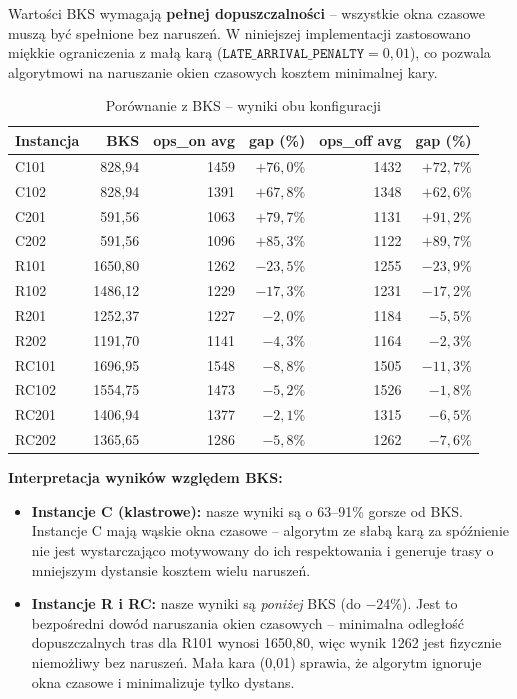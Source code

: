 \documentclass[11pt,a4paper]{article}
\begin{document}
Wartości BKS wymagają \textbf{pełnej dopuszczalności} -- wszystkie okna czasowe muszą być
spełnione bez naruszeń. W niniejszej implementacji zastosowano miękkie ograniczenia
z małą karą ($\texttt{LATE\_ARRIVAL\_PENALTY} = 0{,}01$), co pozwala algorytmowi
na naruszanie okien czasowych kosztem minimalnej kary.

\begin{table}[H]
\centering
\caption{Porównanie z BKS -- wyniki obu konfiguracji}
\begin{tabular}{lrrrrr}
\toprule
Instancja & BKS & ops\_on avg & gap (\%) & ops\_off avg & gap (\%) \\
\midrule
C101  & 828{,}94  & 1459 & $+76{,}0\%$ & 1432 & $+72{,}7\%$ \\
C102  & 828{,}94  & 1391 & $+67{,}8\%$ & 1348 & $+62{,}6\%$ \\
C201  & 591{,}56  & 1063 & $+79{,}7\%$ & 1131 & $+91{,}2\%$ \\
C202  & 591{,}56  & 1096 & $+85{,}3\%$ & 1122 & $+89{,}7\%$ \\
R101  & 1650{,}80 & 1262 & $-23{,}5\%$ & 1255 & $-23{,}9\%$ \\
R102  & 1486{,}12 & 1229 & $-17{,}3\%$ & 1231 & $-17{,}2\%$ \\
R201  & 1252{,}37 & 1227 & $-2{,}0\%$  & 1184 & $-5{,}5\%$  \\
R202  & 1191{,}70 & 1141 & $-4{,}3\%$  & 1164 & $-2{,}3\%$  \\
RC101 & 1696{,}95 & 1548 & $-8{,}8\%$  & 1505 & $-11{,}3\%$ \\
RC102 & 1554{,}75 & 1473 & $-5{,}2\%$  & 1526 & $-1{,}8\%$  \\
RC201 & 1406{,}94 & 1377 & $-2{,}1\%$  & 1315 & $-6{,}5\%$  \\
RC202 & 1365{,}65 & 1286 & $-5{,}8\%$  & 1262 & $-7{,}6\%$  \\
\bottomrule
\end{tabular}
\end{table}

\textbf{Interpretacja wyników względem BKS:}

\begin{itemize}
    \item \textbf{Instancje C (klastrowe):} nasze wyniki są o 63--91\% gorsze
          od BKS. Instancje C mają wąskie okna czasowe -- algorytm ze słabą
          karą za spóźnienie nie jest wystarczająco motywowany do ich respektowania
          i generuje trasy o mniejszym dystansie kosztem wielu naruszeń.
    \item \textbf{Instancje R i RC:} nasze wyniki są \emph{poniżej} BKS (do $-24\%$).
          Jest to bezpośredni dowód naruszania okien czasowych -- minimalna
          odległość dopuszczalnych tras dla R101 wynosi 1650{,}80, więc wynik
          1262 jest fizycznie niemożliwy bez naruszeń. Mała kara (0{,}01) sprawia,
          że algorytm ignoruje okna czasowe i minimalizuje tylko dystans.
\end{itemize}
\end{document}
